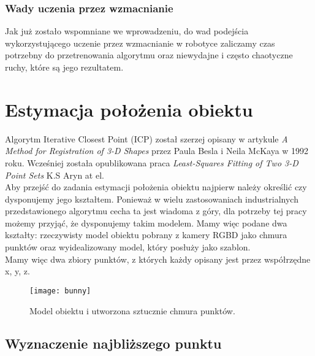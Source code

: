 \documentclass[12pt]{article}
\begin{document}
\subsubsection{Wady uczenia przez wzmacnianie}
Jak już zostało wspomniane we wprowadzeniu, do wad podejścia wykorzystującego uczenie przez wzmacnianie w robotyce zaliczamy czas potrzebny do przetrenowania algorytmu oraz niewydajne i często chaotyczne ruchy, które są jego rezultatem.

\newpage
\section{Estymacja położenia obiektu}
Algorytm Iterative Closest Point (ICP) został szerzej opisany w artykule \emph{A Method for Registration of 3-D Shapes} przez Paula Besla i Neila McKaya w 1992 roku. Wcześniej została opublikowana praca \emph{Least-Squares Fitting of Two 3-D Point Sets} K.S Aryn at el. 
\\
Aby przejść do zadania estymacji położenia obiektu najpierw należy określić czy dysponujemy jego kształtem. Ponieważ w wielu zastosowaniach industrialnych przedstawionego algorytmu cecha ta jest wiadoma z góry, dla potrzeby tej pracy możemy przyjąć, że dysponujemy takim modelem. Mamy więc podane dwa kształty: rzeczywisty model obiektu pobrany z kamery RGBD jako chmura punktów oraz wyidealizowany model, który posłuży jako szablon.
\\
Mamy więc dwa zbiory punktów, z których każdy opisany jest przez współrzędne x, y, z.

\begin{figure}[h]
\centering
\texttt{[image: bunny]}
\caption{Model obiektu i utworzona sztucznie chmura punktów.}
\end{figure}

\subsection{Wyznaczenie najbliższego punktu}
\end{document}
